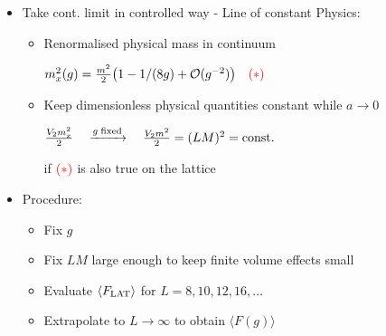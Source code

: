 \documentclass{beamer}
\begin{document}
\begin{frame}
\begin{itemize}
\item Take cont. limit in controlled way - {\color{blue!90} Line of constant Physics:}
\begin{itemize}
\item Renormalised physical mass in continuum\\
\begin{center}
$m_{x}^{2}(g) = \frac{m^{2}}{2} \big(1- 1/(8g) + \mathcal{O}(g^{-2})\big)\quad {\color{red}(\ast)}$
\end{center}
\item Keep dimensionless physical quantities constant while $a\to 0$\\
\begin{center}
$\frac{V_{2}m_{x}^{2}}{2} \quad \xrightarrow{g \;{\rm fixed}}{} \quad \frac{V_{2}m^{2}}{2} = (LM)^{2} = {\rm const.}$
\end{center}
if ${\small \color{red}(\ast)}$ is also true on the lattice
\end{itemize}\vspace{2mm}
\item Procedure:
\begin{itemize}
\item Fix $g$
\item Fix $LM$ large enough to keep finite volume effects small
\item Evaluate $\langle F_{\rm LAT} \rangle$ for $L=8,10,12,16,\ldots$
\item Extrapolate to $L\to \infty$ to obtain $\langle F(g) \rangle$
\end{itemize}
\end{itemize}

\begin{center}


\end{center}
\end{frame}
\end{document}
